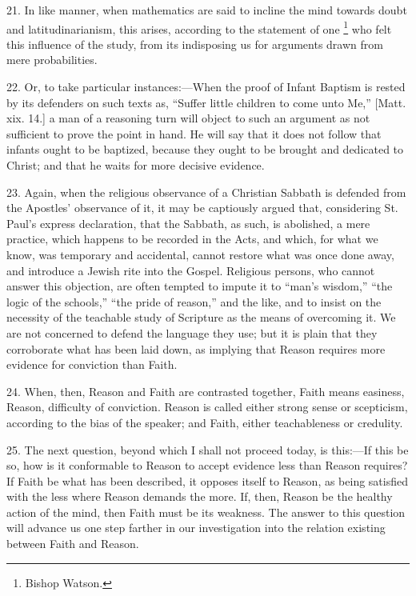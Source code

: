 21. In like manner, when mathematics are said to incline the mind
towards doubt and latitudinarianism, this arises, according to the
statement of one \footnote{Bishop Watson.} who felt
this influence of the study, from its indisposing us for arguments
drawn from mere probabilities.

22. Or, to take particular instances:—When the proof of Infant
Baptism is rested by its defenders on such texts as, ``Suffer
little children to come unto Me,'' [Matt. xix. 14.] a man of a
reasoning turn will object to such an argument as not sufficient to
prove the point in hand. He will say that it does not follow that
infants ought to be baptized, because they ought to be brought and
dedicated to Christ; and that he waits for more decisive evidence.

23. Again, when the religious observance of a Christian Sabbath is
defended from the Apostles' observance of it, it may be captiously
argued that, considering St. Paul's express declaration, that the
Sabbath, as such, is abolished, a mere practice, which happens to be
recorded in the Acts, and which, for what we know, was temporary and
accidental, cannot restore what was once done away, and introduce a
Jewish rite into the Gospel. Religious persons, who cannot answer this
objection, are often tempted to impute it to ``man's wisdom,''
``the logic of the schools,'' ``the pride of reason,''
and the like, and to insist on the necessity of the teachable study of
Scripture as the means of overcoming it. We are not concerned to
defend the language they use; but it is plain that they corroborate
what has been laid down, as implying that Reason requires more
evidence for conviction than Faith.

24. When, then, Reason and Faith are contrasted together, Faith
means easiness, Reason, difficulty of conviction. Reason is called
either strong sense or scepticism, according to the bias of the
speaker; and Faith, either teachableness or credulity.

25. The next question, beyond which I shall not proceed today, is
this:—If this be so, how is it conformable to Reason to accept
evidence less than Reason requires? If Faith be what has been
described, it opposes itself to Reason, as being satisfied with the
less where Reason demands the more. If, then, Reason be the healthy
action of the mind, then Faith must be its weakness. The answer to
this question will advance us one step farther in our investigation
into the relation existing between Faith and Reason.

